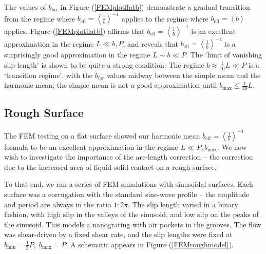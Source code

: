 \documentclass[12pt, a4paper, twoside, openright]{book}
\newcommand{\bmin}{\ensuremath{b_{\mathrm{min}}}}
\newcommand{\bmax}{\ensuremath{b_{\mathrm{max}}}}
\newcommand{\bfar}{\ensuremath{b_{\mathrm{far}}}}
\newcommand{\beffh}{\ensuremath{b_{\mathrm{eff}}} = \left< \frac{1}{b} \right>^{-1} }
\newcommand{\beffm}{\ensuremath{b_{\mathrm{eff}}} = \left< b \right> }
\begin{document}
The values of $\bfar$ in Figure (\ref{FEMplotflatb}) demonstrate a gradual transition from the regime where $\beffh$ applies to the regime where $\beffm$ applies.
Figure (\ref{FEMplotflatb}) affirms that $\beffh$ is an excellent approximation in the regime $L \ll b,P$, and reveals that $\beffh$ is a surprisingly good approximation in the regime $ L \sim b \ll P$.
 The `limit of vanishing slip length' is shown to be quite a strong condition: The regime $b \approx \frac{1}{1	0} L \ll P$ is a `transition regime', with the $\bfar$ values midway between the simple mean and the harmonic mean; the simple mean is not a good approximation until $\bmax \leq \frac{1}{40}L$.

\clearpage
\subsection{Rough Surface}

The FEM testing on a flat surface showed our harmonic mean $\beffh$ formula to be an excellent approximation in the regime $L \ll P, \bmax$.  We now wish to investigate the importance of the arc-length correction -- the correction due to the increased area of liquid-solid contact on a rough surface.

To that end, we ran a series of FEM simulations with sinusoidal surfaces. Each surface was a corrugation with the standard sine-wave profile -- the amplitude and period are always in the ratio $1:2\pi$.  The slip length varied in a binary fashion, with high slip in the valleys of the sinusoid, and low slip on the peaks of the sinusoid.  This models a nanograting with air pockets in the grooves.  The flow was shear-driven by a fixed shear rate, and the slip lengths were fixed at $\bmin = \frac{1}{5} P, \; \bmax = P$.  A schematic appears in Figure (\ref{FEMroughmodel}).
\end{document}

